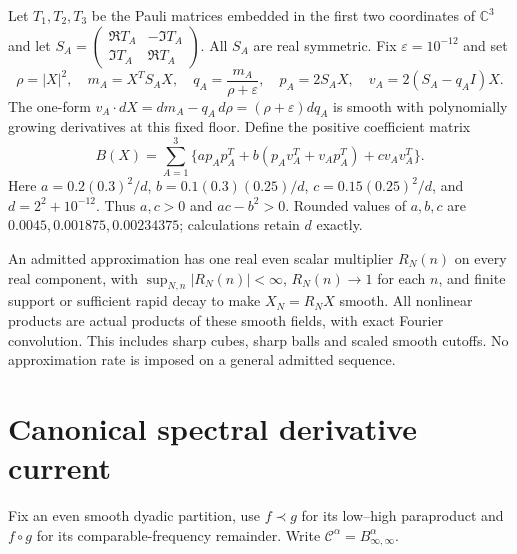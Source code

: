 \documentclass[11pt]{article}
\newcommand{\C}{\mathbb C}
\newcommand{\eps}{\varepsilon}
\begin{document}
Let $T_1,T_2,T_3$ be the Pauli matrices embedded in the first two coordinates
of $\C^3$ and let
$S_A=\left(\begin{smallmatrix}\Re T_A&-\Im T_A\\\Im T_A&\Re T_A\end{smallmatrix}\right)$.
All $S_A$ are real symmetric. Fix $\eps=10^{-12}$ and set
\begin{equation}\label{eq:oneform}
 \rho=|X|^2,\quad m_A=X^TS_AX,\quad q_A=\frac{m_A}{\rho+\eps},
 \quad p_A=2S_AX,\quad v_A=2(S_A-q_AI)X.
\end{equation}
The one-form $v_A\cdot dX=dm_A-q_A\,d\rho=(\rho+\eps)dq_A$
is smooth with polynomially growing derivatives at this fixed floor.
Define the positive coefficient matrix
\begin{equation}\label{eq:B}
 B(X)=\sum_{A=1}^3\{a p_Ap_A^T+b(p_Av_A^T+v_Ap_A^T)+c v_Av_A^T\}.
\end{equation}
Here $a=0.2(0.3)^2/d$, $b=0.1(0.3)(0.25)/d$,
$c=0.15(0.25)^2/d$, and $d=2^2+10^{-12}$.
Thus $a,c>0$ and $ac-b^2>0$. Rounded values of $a,b,c$ are
$0.0045,0.001875,0.00234375$; calculations retain $d$ exactly.

An admitted approximation has one real even scalar multiplier $R_N(n)$
on every real component, with $\sup_{N,n}|R_N(n)|<\infty$,
$R_N(n)\to1$ for each $n$, and finite support or sufficient rapid decay
to make $X_N=R_NX$ smooth. All nonlinear products are actual products
of these smooth fields, with exact Fourier convolution. This includes
sharp cubes, sharp balls and scaled smooth cutoffs. No approximation rate
is imposed on a general admitted sequence.

\section{Canonical spectral derivative current}
Fix an even smooth dyadic partition, use $f\prec g$ for its low--high
paraproduct and $f\circ g$ for its comparable-frequency remainder.
Write $\mathcal C^\alpha=B^\alpha_{\infty,\infty}$.
\end{document}
